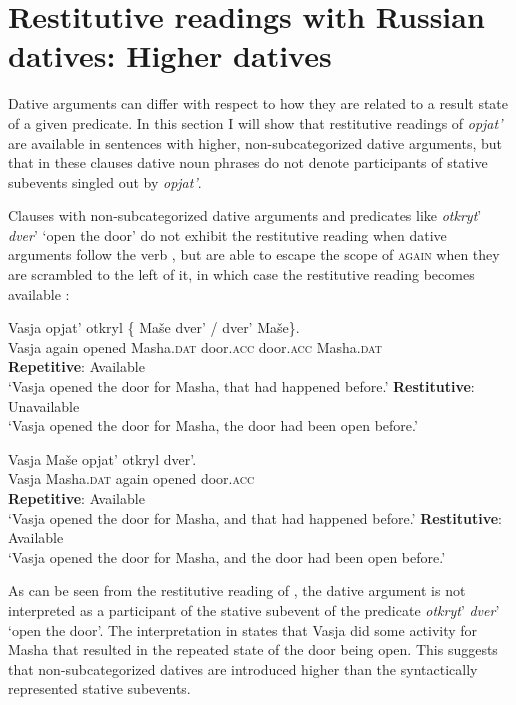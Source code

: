 \documentclass[output=paper]{langscibook}
\begin{document}
\section{Restitutive readings with Russian datives: Higher datives}\label{s4}

Dative arguments can differ with respect to how they are related to a result state of a given predicate. In this section I will show that restitutive readings of \textit{opjat’} are available in sentences with higher, non-subcategorized dative arguments, but that in these clauses dative noun phrases do not denote participants of stative subevents singled out by \textit{opjat’}.



Clauses with non-subcategorized dative arguments and predicates like \textit{otkryt}’ \textit{dver}’ ‘open the door’ do not exhibit the restitutive reading when dative arguments follow the verb , but are able to escape the scope of \textsc{again} when they are scrambled to the left of it, in which case the restitutive reading becomes available :


 \ea\label{ex:bondarenko:31}
\gll Vasja opjat’ otkryl \{\hspace{-2pt} Maše dver’ / dver’ Maše\}.\\
     Vasja again opened {} Masha.\textsc{dat} door.\textsc{acc} {} door.\textsc{acc} Masha.\textsc{dat}\\
\ea \textbf{Repetitive}: Available\\
`Vasja opened the door for Masha, that had happened before.'
\ex  \textbf{Restitutive}: Unavailable\\
`Vasja opened the door for Masha, the door had been open   before.'
\z\z

 \ea\label{ex:bondarenko:32}
\gll Vasja Maše opjat’ otkryl dver’.\\
     Vasja Masha.\textsc{dat} again opened door.\textsc{acc}\\
\ea \textbf{Repetitive}: Available\\
`Vasja opened the door for Masha, and that had happened   before.'
\ex \textbf{Restitutive}: Available\label{ex:bondarenko:32b}\\
`Vasja opened the door for Masha, and the door had been open   before.'
\z\z


\noindent As can be seen from the restitutive reading of , the dative argument is not interpreted as a participant of the stative subevent of the predicate \textit{otkryt}’ \textit{dver}’ ‘open the door’. The interpretation in  states that Vasja did some activity for Masha that resulted in the repeated state of the door being open. This suggests that non-subcategorized datives are introduced higher than the syntactically represented stative subevents.
\end{document}
